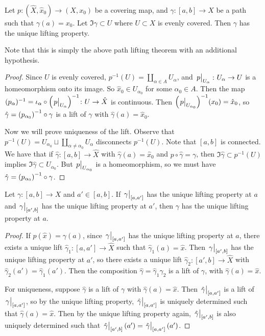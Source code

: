 \begin{lemma}
	Let \( p \colon (\hat X, \hat x_0) \to (X, x_0) \) be a covering map, and \( \gamma \colon [a,b] \to X \) be a path such that \( \gamma(a) = x_0 \).
	Let \( \Im \gamma \subset U \) where \( U \subset X \) is evenly covered.
	Then \( \gamma \) has the unique lifting property.
\end{lemma}
Note that this is simply the above path lifting theorem with an additional hypothesis.
\begin{proof}
	Since \( U \) is evenly covered, \( p^{-1}(U) = \coprod_{\alpha \in A} U_\alpha \), and \( \eval{p}_{U_\alpha} \colon U_\alpha \to U \) is a homeomorphism onto its image.
	So \( \hat x_0 \in U_{\alpha_0} \) for some \( \alpha_0 \in A \).
	Then the map \( (p_\alpha)^{-1} = \iota_\alpha \circ \qty(\eval{p}_{U_\alpha})^{-1} \colon U \to \hat X \) is continuous.
	Then \( \qty(\eval{p}_{U_{\alpha_0}})^{-1}(x_0) = \hat x_0 \), so \( \hat \gamma = \qty(p_{\alpha_0})^{-1} \circ \gamma \) is a lift of \( \gamma \) with \( \hat\gamma(a) = \hat x_0 \).

	Now we will prove uniqueness of the lift.
	Observe that \( p^{-1}(U) = U_{\alpha_0} \sqcup \coprod_{\alpha \neq \alpha_0} U_\alpha \) disconnects \( p^{-1}(U) \).
	Note that \( [a,b] \) is connected.
	We have that if \( \hat\gamma \colon[a,b] \to \hat X \) with \( \hat \gamma(a) = \hat x_0 \) and \( p \circ \hat\gamma = \gamma \), then \( \Im \hat\gamma \subset p^{-1}(U) \) implies \( \Im \hat\gamma \subset U_{\alpha_0} \).
	But \( \eval{p}_{U_{\alpha_0}} \) is a homeomorphism, so we must have \( \hat \gamma = \qty(p_{\alpha_0})^{-1} \circ \gamma \).
\end{proof}
\begin{lemma}
	Let \( \gamma \colon [a,b] \to X \) and \( a' \in [a,b] \).
	If \( \eval{\gamma}_{[a,a']} \) has the unique lifting property at \( a \) and \( \eval{\gamma}_{[a',b]} \) has the unique lifting property at \( a' \), then \( \gamma \) has the unique lifting property at \( a \).
\end{lemma}
\begin{proof}
	If \( p(\hat x) = \gamma(a) \), since \( \eval{\gamma}_{[a,a']} \) has the unique lifting property at \( a \), there exists a unique lift \( \hat\gamma_1 : [a,a'] \to \hat X \) such that \( \hat\gamma_1(a) = \hat x \).
	Then \( \eval{\gamma}_{[a',b]} \) has the unique lifting property at \( a' \), so there exists a unique lift \( \hat\gamma_2 \colon [a',b] \to \hat X \) with \( \hat\gamma_2(a') = \hat\gamma_1(a') \).
	Then the composition \( \hat\gamma=\hat\gamma_1\hat\gamma_2 \) is a lift of \( \gamma \), with \( \hat\gamma(a) = \hat x \).

	For uniqueness, suppose \( \hat\gamma \) is a lift of \( \gamma \) with \( \hat\gamma(a) = \hat x \).
	Then \( \eval{\hat\gamma}_{[a,a']} \) is a lift of \( \eval{\gamma}_{[a,a']} \), so by the unique lifting property, \( \eval{\hat\gamma}_{[a,a']} \) is uniquely determined such that \( \hat\gamma(a) = \hat x \).
	Then by the unique lifting property again, \( \eval{\hat\gamma}_{[a',b]} \) is also uniquely determined such that \( \eval{\hat\gamma}_{[a',b]}(a') = \eval{\hat\gamma}_{[a,a']}(a') \).
\end{proof}
